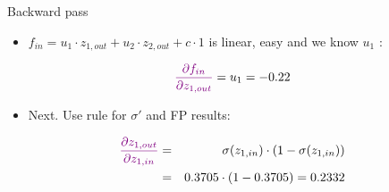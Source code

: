 \begin{vbframe}{Backward pass}
\begin{itemize}
    \item $f_{in} = u_1 \cdot z_{1,out} + u_2 \cdot z_{2,out} + c \cdot 1$ is linear, easy and we know $u_1$ :
  \end{itemize}
  \begin{eqnarray*}
    \textcolor{violet}{\frac{\partial f_{in}}{\partial z_{1,out}}} = u_1 = -0.22
  \end{eqnarray*}
  \begin{figure}
    \centering
  \end{figure}
\framebreak

  \begin{itemize}
    \item Next. Use rule for $\sigma'$ and FP results:
  \end{itemize}
  \begin{eqnarray*}
    \textcolor{violet}{\frac{\partial z_{1,out}}{\partial z_{1,in}}}  &=& \sigma({z_{1,in}}) \cdot (1-\sigma({z_{1,in}})) \\&=&  \num[round-mode=places,round-precision=4]{0.3705169} \cdot (1 - \num[round-mode=places,round-precision=4]{0.3705169}) = \num[round-mode=places,round-precision=4]{0.2332341}
  \end{eqnarray*}
  \begin{figure}
    \centering
  \end{figure}
\framebreak


\end{vbframe}
